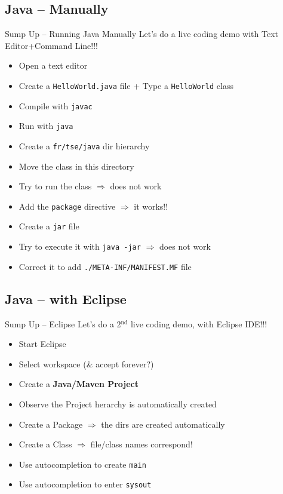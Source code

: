 \documentclass[English,c,%
hyperref={%
    pdftitle={FISA-DE2 OOP in Java},%
    pdfauthor={Muller, Gravier, Laforest, Subercaze},%
    pdfsubject={OOP in Java},%
    pdfkeywords={OOP, Java},%
    colorlinks=true,%
    urlcolor=blue,%
    linkcolor=%
    },%
xcolor={pdftex,svgnames} %
]{beamer}
\begin{document}
\subsection{Java -- Manually}

\begin{frame}{Sump Up -- Running Java Manually}
Let's do a live coding demo with Text Editor+Command Line!!!
\begin{itemize}
  \item Open a text editor
  \item Create a \texttt{HelloWorld.java} file + Type a \texttt{HelloWorld} class
  \item Compile with \texttt{javac}
  \item Run with \texttt{java}
  \medskip
  \item Create a \texttt{fr/tse/java} dir hierarchy
  \item Move the class in this directory
  \item Try to run the class $\Rightarrow$ does not work
  \item Add the \texttt{package} directive $\Rightarrow$ it works!!
  \medskip
  \item Create a \texttt{jar} file
  \item Try to execute it with \texttt{java -jar} $\Rightarrow$ does not work
  \item Correct it to add \texttt{./META-INF/MANIFEST.MF} file
\end{itemize}
\end{frame}

\subsection{Java -- with Eclipse}
\begin{frame}{Sump Up -- Eclipse}
Let's do a 2$^{\text{nd}}$ live coding demo, with Eclipse IDE!!!
\begin{itemize}
  \item Start Eclipse
  \item Select workspace (\& accept forever?)
  \item Create a \textbf{Java/Maven Project}
  \item Observe the Project herarchy is automatically created
  \item Create a Package $\Rightarrow$ the dirs are created automatically
  \item Create a Class $\Rightarrow$ file/class names correspond!
  \item Use autocompletion to create \texttt{main}
  \item Use autocompletion to enter \texttt{sysout}
\end{itemize}
\end{frame}
\end{document}
